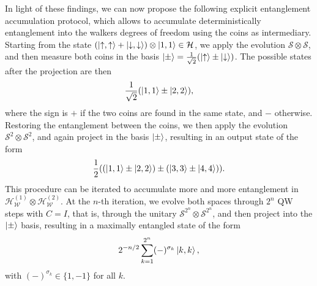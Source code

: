 \documentclass[
	aps, pra,
	superscriptaddress, twocolumn,
	floatfix,
	10pt
]{revtex4-1}
\newcommand{\on}[1]{\operatorname{#1}}
\newcommand{\parTitle}[1]{\noindent{\color{Mahogany}(\emph{#1})}}
\newcommand{\RR}{\mathbb{R}}
\newcommand{\calC}{{\mathcal{C}}}
\newcommand{\calH}{{\mathcal{H}}}
\newcommand{\calS}{{\mathcal{S}}}
\newcommand{\calW}{{\mathcal{W}}}
\newcommand{\HC}{\calH_\calC}
\newcommand{\HW}{\calH_\calW}
\renewcommand{\parTitle}[1]{}
\begin{document}
\parTitle{Specific optimal accumulation protocol}
In light of these findings, we can now propose the following explicit entanglement accumulation protocol, which allows to accumulate deterministically entanglement into the walkers degrees of freedom using the coins as intermediary.
Starting from the state
$(\ket{\uparrow,\uparrow}+\ket{\downarrow,\downarrow})\otimes\ket{1,1}\in\calH$,
we apply the evolution $\calS\otimes\calS$, and then measure both coins in the basis $\ket\pm=\frac{1}{\sqrt2}(\ket\uparrow\pm\ket\downarrow)$.
The possible states after the projection are then
\begin{equation}
    \frac1{\sqrt2}(\ket{1,1} \pm \ket{2,2}),
\end{equation}
where the sign is $+$ if the two coins are found in the same state, and $-$ otherwise.
Restoring the entanglement between the coins, we then apply the evolution $\calS^2\otimes\calS^2$, and again project in the basis $\ket\pm$, resulting in an output state of the form
\begin{equation}
    \frac12((\ket{1,1}\pm\ket{2,2}) \pm (\ket{3,3} \pm \ket{4,4})).
\end{equation}
This procedure can be iterated to accumulate more and more entanglement in $\HW^{(1)}\otimes\HW^{(2)}$.
At the $n$-th iteration, we evolve both spaces through $2^n$ QW steps with $C=I$, that is, through the unitary $\calS^{2^n}\otimes\calS^{2^n}$, and then project into the $\ket\pm$ basis,
resulting in a maximally entangled state of the form
\begin{equation}
    2^{-n/2}\sum_{k=1}^{2^n} (-)^{\sigma_k}\ket{k,k},
\end{equation}
with $(-)^{\sigma_k}\in\{1,-1\}$ for all $k$.

\end{document}
